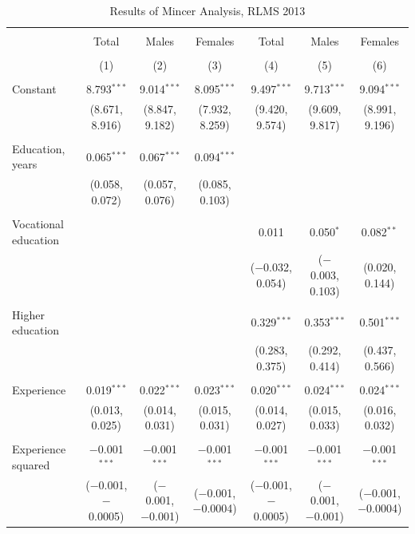 \documentclass[alpha-refs]{wiley-article-01g}
\begin{document}
\begin{landscape}

\fontsize{9}{11}
\selectfont

\begin{table}[!htbp] \centering 
\renewcommand{\arraystretch}{1.0}
  \caption{Results of Mincer Analysis, RLMS 2013} 
  \label{} 
\begin{tabular}{@{\extracolsep{5pt}}lcccccc} 
\\[-1.8ex]\hline 
\hline \\[-1.8ex] 
 & Total & Males & Females & Total & Males & Females \\ 
\\[-1.8ex] & (1) & (2) & (3) & (4) & (5) & (6)\\ 
\hline \\[-1.8ex] 
 Constant & 8.793$^{***}$ & 9.014$^{***}$ & 8.095$^{***}$ & 9.497$^{***}$ & 9.713$^{***}$ & 9.094$^{***}$ \\ 
  & (8.671, 8.916) & (8.847, 9.182) & (7.932, 8.259) & (9.420, 9.574) & (9.609, 9.817) & (8.991, 9.196) \\ 
  & & & & & & \\ 
 Education, years & 0.065$^{***}$ & 0.067$^{***}$ & 0.094$^{***}$ &  &  &  \\ 
  & (0.058, 0.072) & (0.057, 0.076) & (0.085, 0.103) &  &  &  \\ 
  & & & & & & \\ 
 Vocational education &  &  &  & 0.011 & 0.050$^{*}$ & 0.082$^{**}$ \\ 
  &  &  &  & ($-$0.032, 0.054) & ($-$0.003, 0.103) & (0.020, 0.144) \\ 
  & & & & & & \\ 
 Higher education &  &  &  & 0.329$^{***}$ & 0.353$^{***}$ & 0.501$^{***}$ \\ 
  &  &  &  & (0.283, 0.375) & (0.292, 0.414) & (0.437, 0.566) \\ 
  & & & & & & \\ 
 Experience & 0.019$^{***}$ & 0.022$^{***}$ & 0.023$^{***}$ & 0.020$^{***}$ & 0.024$^{***}$ & 0.024$^{***}$ \\ 
  & (0.013, 0.025) & (0.014, 0.031) & (0.015, 0.031) & (0.014, 0.027) & (0.015, 0.033) & (0.016, 0.032) \\ 
  & & & & & & \\ 
 Experience squared & $-$0.001$^{***}$ & $-$0.001$^{***}$ & $-$0.001$^{***}$ & $-$0.001$^{***}$ & $-$0.001$^{***}$ & $-$0.001$^{***}$ \\ 
  & ($-$0.001, $-$0.0005) & ($-$0.001, $-$0.001) & ($-$0.001, $-$0.0004) & ($-$0.001, $-$0.0005) & ($-$0.001, $-$0.001) & ($-$0.001, $-$0.0004) \\ 

\end{tabular}
\end{table}
\end{landscape}
\end{document}
